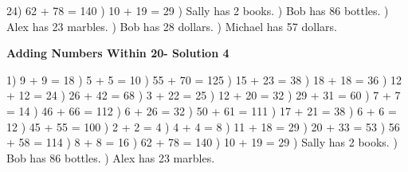 \documentclass{article}%
\begin{document}
24) 62 + 78 = 140%
) 10 + 19 = 29%
) Sally has 2 books.%
) Bob has 86 bottles.%
) Alex has 23 marbles.%
) Bob has 28 dollars.%
) Michael has 57 dollars.%
\newline%
\newpage%
\large%
\begin{center}%
\textbf{Adding Numbers Within 20- Solution 4}%
\newline%
\end{center} \normalsize%
1) 9 + 9 = 18%
) 5 + 5 = 10%
) 55 + 70 = 125%
) 15 + 23 = 38%
) 18 + 18 = 36%
) 12 + 12 = 24%
) 26 + 42 = 68%
) 3 + 22 = 25%
) 12 + 20 = 32%
) 29 + 31 = 60%
) 7 + 7 = 14%
) 46 + 66 = 112%
) 6 + 26 = 32%
) 50 + 61 = 111%
) 17 + 21 = 38%
) 6 + 6 = 12%
) 45 + 55 = 100%
) 2 + 2 = 4%
) 4 + 4 = 8%
) 11 + 18 = 29%
) 20 + 33 = 53%
) 56 + 58 = 114%
) 8 + 8 = 16%
) 62 + 78 = 140%
) 10 + 19 = 29%
) Sally has 2 books.%
) Bob has 86 bottles.%
) Alex has 23 marbles.%
\end{document}
